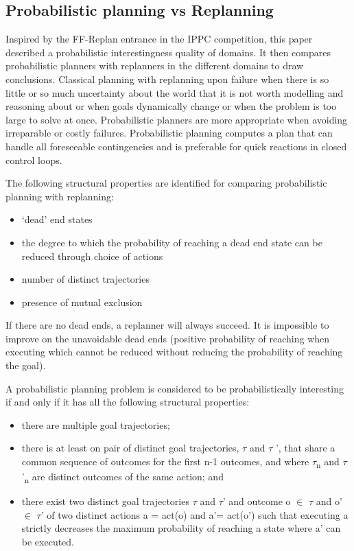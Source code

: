\documentclass[runningheads,a4paper]{llncs}
\begin{document}



\subsection{Probabilistic planning vs Replanning}
Inspired by the FF-Replan entrance in the IPPC competition, this paper described a probabilistic interestingness quality of domains. It then compares probabilistic planners with replanners in the different domains to draw conclusions. Classical planning with replanning upon failure when there is so little or so much uncertainty about the world that it is not worth modelling and reasoning about or when goals dynamically change or when the problem is too large to solve at once. Probabilistic planners are more appropriate when avoiding irreparable or costly failures. Probabilistic planning computes a plan that can handle all foreseeable contingencies and is preferable for quick reactions in closed control loops.

The following structural properties are identified for comparing probabilistic planning with replanning:
\begin{itemize}
	\item `dead' end states
	\item the degree to which the probability of reaching a dead end state can be reduced through choice of actions
	\item number of distinct trajectories
	\item presence of mutual exclusion
\end{itemize}

If there are no dead ends, a replanner will always succeed. It is impossible to improve on the unavoidable dead ends (positive probability of reaching when executing which cannot be reduced without reducing the probability of reaching the goal).


A probabilistic planning problem is considered to be probabilistically interesting if and only if it has all the following structural properties:

\begin{itemize}
	\item there are multiple goal trajectories;
	\item there is at least on pair of distinct goal trajectories, $\tau$ and $\tau$ ', that share a common sequence of outcomes for the first n-1 outcomes, and where $\tau$\textsubscript{n} and $\tau$'\textsubscript{n} are distinct outcomes of the same action; and
	\item there exist two distinct goal trajectories $\tau$ and $\tau$' and outcome o $\in$ $\tau$ and o' $\in$ $\tau$' of two distinct actions a = act(o) and a'= act(o') such that executing a strictly decreases the maximum probability of reaching a state where a' can be executed.
\end{itemize}
\end{document}
